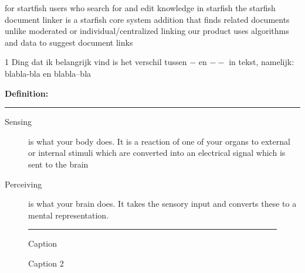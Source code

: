for startfish users
who search for and edit knowledge in starfish
the starfish document linker 
is a starfish core system addition
that finds related documents
unlike moderated or individual/centralized linking
our product uses algorithms and data to suggest document links


1 Ding dat ik belangrijk vind is het verschil tussen $-$ en $--$ in tekst, namelijk:\\ blabla-bla en blabla--bla

\begin{shaded}
\textbf{{\large Definition:}} \vspace{0.5\baselineskip} \hrule
	\begin{description}
		\item[Sensing] is what your body does. It is a reaction of one of your organs to external or internal stimuli which are converted into an electrical signal which is sent to the brain
		\item[Perceiving] is what your brain does. It takes the sensory input and converts these to a mental representation. 
	\end{description}
\end{shaded}

\begin{figure}
\hhrule \vspace{0.5\baselineskip}
\null\hfill\parbox[b]{0.45\linewidth}{%
\centering
\def\svgwidth{\linewidth}
}\hfill
\parbox[b]{0.45\linewidth}{%
\centering
\def\svgwidth{\linewidth}
}\hfill\null
\vspace{0.5\baselineskip}\hrule
\null\hfill\parbox[t]{0.45\linewidth}{%
\caption[Short Caption]{Caption}
\label{fig:motn}
}\hfill
\parbox[t]{0.45\linewidth}{%
\caption[Short Caption]{Caption 2} 
\label{fig:batman}
}\hfill\null
\hhrule
\end{figure}
